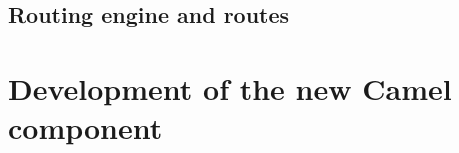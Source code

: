 \documentclass[12pt,final,oneside]{fithesis2}
\begin{document}
\subsection*{Routing engine and routes}


\section{Development of the new Camel component}

%
\end{document}
